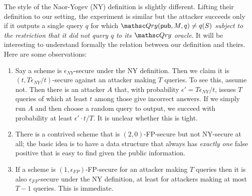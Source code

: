 The style of the Naor-Yogev (NY) definition is slightly different. 
Lifting their definition to our setting, the experiment is similar but the attacker
succeeds only if it outputs a single query $q$ for which $\Qry(\pub, M, q) \neq q(S)$ \emph{subject
to the restriction that it did not query $q$ to its $\Qry$ oracle}.
It will be interesting to understand formally the relation between our definition and theirs.
Here are some observations:
\begin{enumerate}
\item Say a scheme is $\epsilon_{NY}$-secure under the NY definition.
Then we claim it is $(t, T\epsilon_{NY}/t)$-secure against an attacker making $T$ queries. To see
this, assume not. Then there is an attacker $A$ that, with probability $\epsilon'=T\epsilon_{NY}/t$,
issues $T$ queries of which at least $t$ among those give incorrect answers.
If we simply run $A$ and
then choose a random query to output, we succeed with probability at least $\epsilon' \cdot t/T$.
It is unclear whether this is tight.

\item There is a contrived scheme that is $(2, 0)$-FP-secure but not NY-secure at all; the basic idea is
to have a data structure that always has \emph{exactly one} false positive that is easy to find
given the public information.

\item If a scheme is $(1,\epsilon_{FP})$-FP-secure for an attacker making $T$ queries
then it is also $\epsilon_{FP}$-secure under the NY definition,
at least for attackers making at most $T-1$
queries.
This is immediate.
\end{enumerate}

